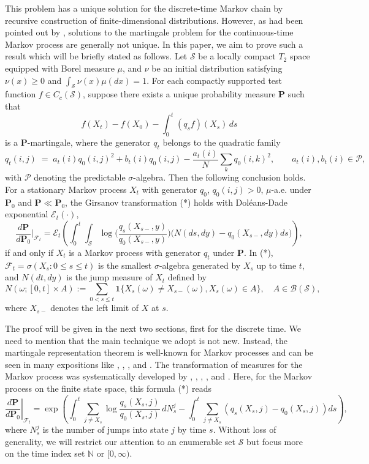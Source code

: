 \documentclass{lms}
\begin{document}
This problem has a unique solution for the discrete-time Markov chain by recursive construction of finite-dimensional distributions. However, as had been pointed out by \cite{StroockVaradhan1969}, solutions to the martingale problem for the continuous-time Markov process are generally not unique. In this paper, we aim to prove 
such a result which will be briefly stated as follows. Let $\mathcal S$ be a locally compact $T_2$ space equipped with Borel measure $\mu$, and $\nu$ be an initial distribution satisfying $\nu(x)\geq 0$ and $\int_{\mathcal S}\nu(x)\mu(dx)=1$. For each compactly supported test function $f \in C_c(\mathcal S)$, suppose there exists a unique probability measure $\mathbf P$ such that
$$f(X_t) - f(X_0) - \int_0^t (q_s f)(X_s)\,ds$$
is a $\mathbf P$-martingale, where the generator $q_t$ belongs to the quadratic family
$$q_t(i,j) \;=\; a_t(i) q_0(i,j)^2 + b_t(i) q_0(i,j) - \frac{a_t(i)}{N}\sum_k q_0(i,k)^2,  \qquad a_t(i), b_t(i) \in \mathcal P,$$
with $\mathcal P$ denoting the predictable $\sigma$-algebra. Then the following conclusion holds. For a stationary Markov process $X_t$ with generator $q_{0}$, $q_0(i,j)>0$, $\mu$-a.e. under $\mathbf P_0$ and $\mathbf P \ll \mathbf P_0$, the Girsanov transformation (*) holds with Dol\'eans-Dade exponential $\mathcal E_t(\cdot)$,
\[\frac{d\mathbf P}{d\mathbf P_0}\Big|_{\mathscr F_t}= \mathcal E_t\left(\int_0^t \int_{\mathcal S} 
\log\Big(\frac{q_s(X_{s-},y)}{q_0(X_{s-},y)}\Big)  \big(N(ds,dy)-q_0(X_{s-},dy)ds\big)\right), \tag{*}\]
if and only if $X_t$ is a Markov process with generator $q_{t}$ under $\mathbf P$. In (*), $\mathscr F_t = \sigma(X_s:0\le s \le t)$ is the smallest $\sigma$-algebra generated by $X_s$ up to time $t$, and $N(dt,dy)$ is the jump measure of $X_t$ defined by
$$N(\omega; [0,t] \times A) := \sum_{0 < s \le t} \mathbf 1{\{X_s(\omega) \neq X_{s-}(\omega), X_s(\omega) \in A\}}, \quad A \in \mathscr B(\mathcal S),$$
where $X_{s-}$ denotes the left limit of $X$ at $s$.

The proof will be given in the next two sections, first for the discrete time. We need to mention that the main technique we adopt is not new. Instead, the martingale representation theorem is well-known for Markov processes and can be seen in many expositions like \cite{clark1970representation}, \cite{buiculescu1982representation}, \cite{Sokol03092015}, and \cite{Criens2024OnTR}. The transformation of measures for the Markov process was systematically developed by \cite{girsanov1960}, \cite{dynkin1965markov}, \cite{DoleansDade1970}, \cite{novikov1972identity}, and \cite{kazamaki1994continuous}. Here, for the Markov process on the finite state space, this formula (*) reads
\[\left.\frac{d\mathbf P}{d\mathbf P_0}\right|_{\mathscr F_t} = \exp\left( \int_0^t \sum_{j \neq X_s} \log \frac{q_{s}(X_s, j)}{q_{0}(X_s, j)} \, dN_s^j - \int_0^t \sum_{j \neq X_s} \left( q_s(X_s, j) - q_{0}(X_s, j) \right) ds \right), \tag{C} \]
where $N_s^j$ is the number of jumps into state $j$ by time $s$. Without loss of generality, we will restrict our attention to an enumerable set $\mathcal S$ but focus more on the time index set $\mathbb N$ or $[0,\infty)$.
\end{document}

